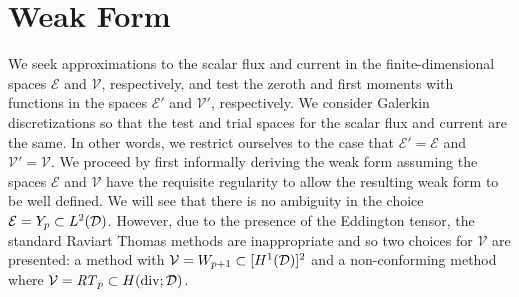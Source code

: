 \documentclass[../doc.tex]{subfiles}
\begin{document}
\section{Weak Form}
We seek approximations to the scalar flux and current in the finite-dimensional spaces $\mathcal{E}$ and $\mathcal{V}$, respectively, and test the zeroth and first moments with functions in the spaces $\mathcal{E}'$ and $\mathcal{V}'$, respectively. We consider Galerkin discretizations so that the test and trial spaces for the scalar flux and current are the same. In other words, we restrict ourselves to the case that $\mathcal{E}' = \mathcal{E}$ and $\mathcal{V}' = \mathcal{V}$. We proceed by first informally deriving the weak form assuming the spaces $\mathcal{E}$ and $\mathcal{V}$ have the requisite regularity to allow the resulting weak form to be well defined. We will see that there is no ambiguity in the choice $\mathcal{E} = Y_p \subset L^2(\mathcal{D})$. However, due to the presence of the Eddington tensor, the standard Raviart Thomas methods are inappropriate and so two choices for $\mathcal{V}$ are presented: a method with $\mathcal{V} = W_{p+1} \subset [H^1(\mathcal{D})]^2$ and a non-conforming method where $\mathcal{V} = \mathit{RT}_p\subset H(\operatorname{div};\mathcal{D})$. 
\end{document}
